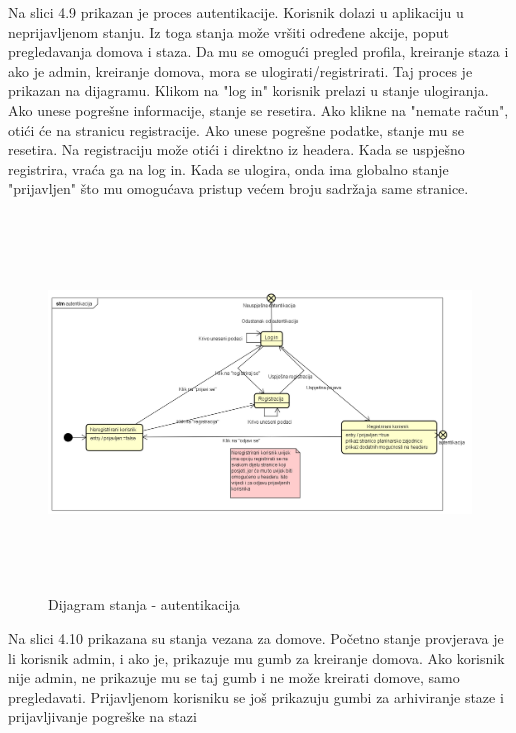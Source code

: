 			Na slici 4.9 prikazan je proces autentikacije. Korisnik dolazi u aplikaciju u neprijavljenom stanju. Iz toga stanja može vršiti određene akcije, poput pregledavanja domova i staza. Da mu se omogući pregled profila, kreiranje staza i ako je admin, kreiranje domova, mora se ulogirati/registrirati. Taj proces je prikazan na dijagramu. Klikom na "log in" korisnik prelazi u stanje ulogiranja. Ako unese pogrešne informacije, stanje se resetira. Ako klikne na "nemate račun", otići će na stranicu registracije. Ako unese pogrešne podatke, stanje mu se resetira. Na registraciju može otići i direktno iz headera. Kada se uspješno registrira, vraća ga na log in. Kada se ulogira, onda ima globalno stanje "prijavljen" što mu omogućava pristup većem broju sadržaja same stranice.
			
			\begin{figure}[H]
				\includegraphics[width=160mm,height=100mm]{dijagrami/sd-autentikacija/autentikacija.png} %
				\centering
				\caption{Dijagram stanja - autentikacija}
				\label{fig:dijagrami_stanja1}
			\end{figure}
			\newpage
			Na slici 4.10 prikazana su stanja vezana za domove. Početno stanje provjerava je li korisnik admin, i ako je, prikazuje mu gumb za kreiranje domova. Ako korisnik nije admin, ne prikazuje mu se taj gumb i ne može kreirati domove, samo pregledavati. Prijavljenom korisniku se još prikazuju gumbi za arhiviranje staze i prijavljivanje pogreške na stazi
			
